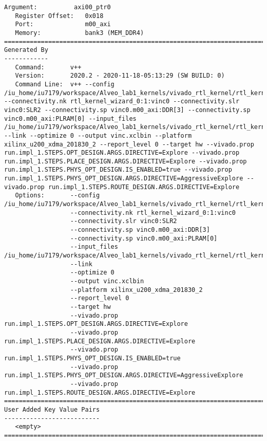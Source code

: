 \begin{lstlisting}[label=func,breakatwhitespace=false,caption=Содержимое vinc.xclbin.info файла.]
   Argument:          axi00_ptr0
   Register Offset:   0x018
   Port:              m00_axi
   Memory:            bank3 (MEM_DDR4)
==============================================================================
Generated By
------------
   Command:       v++
   Version:       2020.2 - 2020-11-18-05:13:29 (SW BUILD: 0)
   Command Line:  v++ --config /iu_home/iu7179/workspace/Alveo_lab1_kernels/vivado_rtl_kernel/rtl_kernel_wizard_0_ex/exports/myconf.conf --connectivity.nk rtl_kernel_wizard_0:1:vinc0 --connectivity.slr vinc0:SLR2 --connectivity.sp vinc0.m00_axi:DDR[3] --connectivity.sp vinc0.m00_axi:PLRAM[0] --input_files /iu_home/iu7179/workspace/Alveo_lab1_kernels/vivado_rtl_kernel/rtl_kernel_wizard_0_ex/exports/rtl_kernel_wizard_0.xo --link --optimize 0 --output vinc.xclbin --platform xilinx_u200_xdma_201830_2 --report_level 0 --target hw --vivado.prop run.impl_1.STEPS.OPT_DESIGN.ARGS.DIRECTIVE=Explore --vivado.prop run.impl_1.STEPS.PLACE_DESIGN.ARGS.DIRECTIVE=Explore --vivado.prop run.impl_1.STEPS.PHYS_OPT_DESIGN.IS_ENABLED=true --vivado.prop run.impl_1.STEPS.PHYS_OPT_DESIGN.ARGS.DIRECTIVE=AggressiveExplore --vivado.prop run.impl_1.STEPS.ROUTE_DESIGN.ARGS.DIRECTIVE=Explore 
   Options:       --config /iu_home/iu7179/workspace/Alveo_lab1_kernels/vivado_rtl_kernel/rtl_kernel_wizard_0_ex/exports/myconf.conf
                  --connectivity.nk rtl_kernel_wizard_0:1:vinc0
                  --connectivity.slr vinc0:SLR2
                  --connectivity.sp vinc0.m00_axi:DDR[3]
                  --connectivity.sp vinc0.m00_axi:PLRAM[0]
                  --input_files /iu_home/iu7179/workspace/Alveo_lab1_kernels/vivado_rtl_kernel/rtl_kernel_wizard_0_ex/exports/rtl_kernel_wizard_0.xo
                  --link
                  --optimize 0
                  --output vinc.xclbin
                  --platform xilinx_u200_xdma_201830_2
                  --report_level 0
                  --target hw
                  --vivado.prop run.impl_1.STEPS.OPT_DESIGN.ARGS.DIRECTIVE=Explore
                  --vivado.prop run.impl_1.STEPS.PLACE_DESIGN.ARGS.DIRECTIVE=Explore
                  --vivado.prop run.impl_1.STEPS.PHYS_OPT_DESIGN.IS_ENABLED=true
                  --vivado.prop run.impl_1.STEPS.PHYS_OPT_DESIGN.ARGS.DIRECTIVE=AggressiveExplore
                  --vivado.prop run.impl_1.STEPS.ROUTE_DESIGN.ARGS.DIRECTIVE=Explore 
==============================================================================
User Added Key Value Pairs
--------------------------
   <empty>
==============================================================================
\end{lstlisting}
